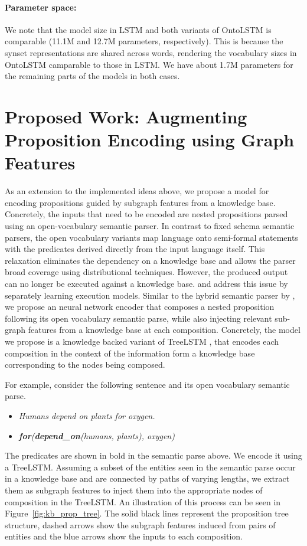 \paragraph{Parameter space:} We note that the model size in LSTM and both variants of OntoLSTM is comparable (11.1M and 12.7M parameters, respectively). This is because the synset representations are shared across words, rendering the vocabulary sizes in OntoLSTM camparable to those in LSTM. We have about 1.7M parameters for the remaining parts of the models in both cases. 

\section{Proposed Work: Augmenting Proposition Encoding using Graph Features}
As an extension to the implemented ideas above, we propose a model for encoding propositions guided by subgraph features from a knowledge base. Concretely, the inputs that need to be encoded are nested propositions parsed using an open-vocabulary semantic parser. In contrast to fixed schema 
semantic parsers, the open vocabulary variants map language onto semi-formal statements with the predicates derived directly from the input language itself. This relaxation eliminates the dependency on a knowledge base and allows the parser broad coverage using distributional techniques.
However, the produced output can no longer be executed against a knowledge base. \cite{lewis2013combining} and \cite{krishnamurthy2015learning} address this issue by separately learning execution models. Similar to the hybrid semantic parser by \cite{gardner2016open}, we propose an neural network
encoder that composes a nested proposition following its open vocabulary semantic parse, while also injecting relevant sub-graph features from a knowledge base at each composition. Concretely, the model we propose is a knowledge backed variant of TreeLSTM \citep{tai2015improved}, that encodes
each composition in the context of the information form a knowledge base corresponding to the nodes being composed.

For example, consider the following sentence and its open vocabulary semantic parse.
\begin{itemize}
 \item[] \textit{Humans depend on plants for oxygen.}
 \item[] \textit{\textbf{for}(\textbf{depend\_on}(humans, plants), oxygen)}
\end{itemize}
The predicates are shown in bold in the semantic parse above. We encode it using a TreeLSTM. Assuming a subset of the entities seen in the semantic parse occur in a knowledge base and are connected by paths of varying lengths, we extract them as subgraph features to inject them into the
appropriate nodes of composition in the TreeLSTM. An illustration of this process can be seen in Figure~\ref{fig:kb_prop_tree}. The solid black lines represent the proposition tree structure, dashed arrows show the subgraph features induced from pairs of entities and the blue arrows show the
inputs to each composition.

